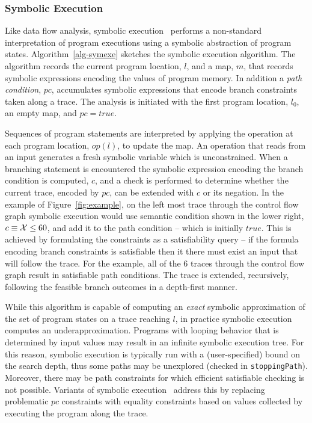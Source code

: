 \subsubsection{Symbolic Execution}
Like data flow analysis, symbolic execution~\cite{king1976symbolic,clarke1976system} 
performs a non-standard interpretation of program executions using 
a symbolic abstraction of program states.
Algorithm~\ref{alg-symexe} sketches the symbolic execution algorithm.
The algorithm records the current program location, $l$,
and a map, $m$, that records symbolic expressions encoding the
values of program memory.  In addition a \textit{path condition}, $pc$,
accumulates symbolic expressions that encode branch constraints 
taken along a trace.  The analysis is initiated with the first
program location, $l_0$, an empty map, and $pc = true$.

Sequences of program statements are interpreted by applying the operation
at each program location, $op(l)$, to update the map.  
An operation that reads from an input generates a fresh symbolic
variable which is unconstrained.  
When a branching statement is encountered the symbolic expression encoding
the branch condition is computed, $c$, and a check is performed
to determine whether the current trace, encoded by $pc$, can be
extended with $c$ or its negation.  
In the example of Figure~\ref{fig:example}, on the left most trace through
the control flow graph symbolic execution would use semantic
condition shown in the lower right, $c \equiv {\cal X} \le 60$,
and add it to the path condition -- which is initially $true$.
This is achieved by formulating the constraints
as a satisfiability query -- if the formula encoding branch constraints
is satisfiable then it there must exist an input that will follow the trace.
For the example, all of the 6 traces through the control flow graph 
result in satisfiable path conditions.
The trace is extended, recursively, following the feasible branch outcomes
in a depth-first manner.

While this algorithm is capable of computing an \textit{exact} symbolic
approximation of the set of program states on a trace reaching $l$, in
practice symbolic execution computes an underapproximation.
Programs with looping behavior that is determined by input values 
may result in an infinite symbolic execution tree. 
For this reason, symbolic execution is
typically run with a (user-specified) bound on the search depth, thus
some paths may be unexplored (checked in {\tt stoppingPath}).   Moreover, there may be path constraints
for which efficient satisfiable checking is not possible.  Variants of
symbolic execution~\cite{godefroid2005dart,sen2005cute,song2008bitblaze} 
address this by replacing problematic $pc$ constraints with equality
constraints based on values collected by executing the program along the trace.

